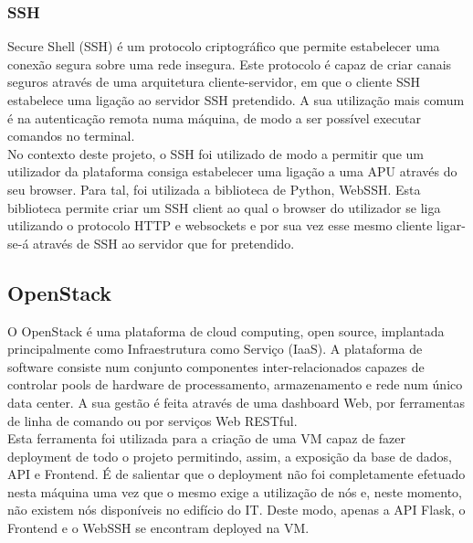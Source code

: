 \subsubsection{SSH}
Secure Shell (SSH) é um protocolo criptográfico que permite estabelecer uma conexão segura sobre uma rede insegura. Este protocolo é capaz de criar canais seguros através de uma arquitetura cliente-servidor, em que o cliente SSH estabelece uma ligação ao servidor SSH pretendido. A sua utilização mais comum é na autenticação remota numa máquina, de modo a ser possível executar comandos no terminal.\cite{ssh}\newline\\
No contexto deste projeto, o SSH foi utilizado de modo a permitir que um utilizador da plataforma consiga estabelecer uma ligação a uma APU através do seu browser. Para tal, foi utilizada a biblioteca de Python, WebSSH.\newline
Esta biblioteca permite criar um SSH client ao qual o browser do utilizador se liga utilizando o protocolo HTTP e websockets e por sua vez esse mesmo cliente ligar-se-á através de SSH ao servidor que for pretendido.


\subsection{OpenStack}
O OpenStack é uma plataforma de cloud computing, open source, implantada principalmente como Infraestrutura como Serviço (IaaS). A plataforma de software consiste num conjunto componentes inter-relacionados capazes de controlar pools de hardware de processamento, armazenamento e rede num único data center. A sua gestão é feita através de uma dashboard Web, por ferramentas de linha de comando ou por serviços Web RESTful.\cite{openstack}\newline\\
Esta ferramenta foi utilizada para a criação de uma VM capaz de fazer deployment de todo o projeto permitindo, assim, a exposição da base de dados, API e Frontend. É de salientar que o deployment não foi completamente efetuado nesta máquina uma vez que o mesmo exige a utilização de nós e, neste momento, não existem nós disponíveis no edifício do IT. Deste modo, apenas a API Flask, o Frontend e o WebSSH se encontram deployed na VM.


